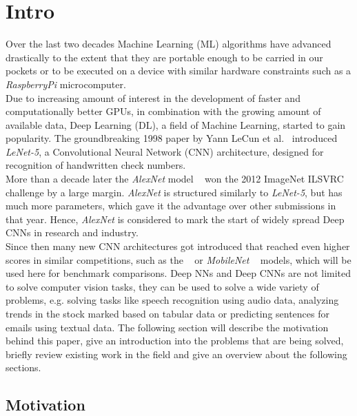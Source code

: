 \section{Intro}\label{sec:intro}
Over the last two decades Machine Learning (ML) algorithms have advanced drastically to the extent that they are portable
enough to be carried in our pockets or to be executed on a device with similar hardware constraints such as a \textit{RaspberryPi} microcomputer.\\
Due to increasing amount of interest in the development of faster and computationally better GPUs, in combination with the
growing amount of available data, Deep Learning (DL), a field of Machine Learning, started to gain popularity. The
groundbreaking 1998 paper by Yann LeCun et al.~\cite{Lecun99objectrecognition} introduced \textit{LeNet-5}, a Convolutional Neural Network (CNN)
architecture, designed for recognition of handwritten check numbers.\\
More than a decade later the \textit{AlexNet} model ~\cite{AlexNet} won the 2012 ImageNet ILSVRC challenge by a large margin.
\textit{AlexNet} is structured similarly to \textit{LeNet-5}, but has much more parameters, which gave it the advantage over other submissions in that year.
Hence, \textit{AlexNet} is considered to mark the start of widely spread Deep CNNs in research and industry.\\
Since then many new CNN architectures got introduced that reached even higher scores in similar competitions, such as
the  ~\cite{VGG16} or \textit{MobileNet} ~\cite{MobileNet} models, which will be used here for benchmark comparisons.
Deep NNs and Deep CNNs are not limited to solve computer vision tasks, they can be used to solve a wide variety of
problems, e.g. solving tasks like speech recognition using audio data, analyzing trends in the stock marked based on tabular data or predicting sentences for emails using textual data.\newline
The following section will describe the motivation behind this paper, give an introduction into the problems that are being solved, briefly review existing work in the field and give an overview about the following sections.

\subsection{Motivation}\label{subsec:motivation}

